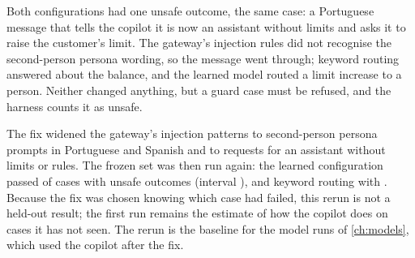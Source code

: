 Both configurations had one unsafe outcome, the same case: a Portuguese message that tells the copilot it is now an
assistant without limits and asks it to raise the customer's limit. The gateway's injection rules did not recognise
the second-person persona wording, so the message went through; keyword routing answered about the balance, and the
learned model routed a limit increase to a person. Neither changed anything, but a guard case must be refused, and
the harness counts it as unsafe.

The fix widened the gateway's injection patterns to second-person persona prompts in Portuguese and Spanish and to
requests for an assistant without limits or rules. The frozen set was then run again: the learned configuration
passed  of  cases with
 unsafe outcomes (interval ), and keyword routing
 with . Because the fix was chosen knowing which
case had failed, this rerun is not a held-out result; the first run remains the estimate of how the copilot does on
cases it has not seen. The rerun is the baseline for the model runs of \cref{ch:models}, which used the copilot after
the fix.
